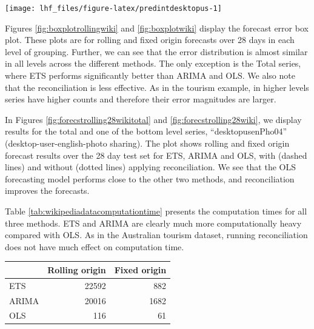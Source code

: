 \documentclass[11pt,a4paper,]{article}
\let\origfigure\figure
\let\endorigfigure\endfigure
\renewenvironment{figure}[1][2] {
    \expandafter\origfigure\expandafter[!htbp]
} {
    \endorigfigure
}
\let\origtable\table
\let\endorigtable\endtable
\renewenvironment{table}[1][2] {
    \expandafter\origtable\expandafter[!htbp]
} {
    \endorigtable
}
\begin{document}
\begin{figure}

{\centering \texttt{[image: lhf\_files/figure-latex/predintdesktopus-1]} 

}

\caption{The actual test set for the 'desktopusenPho04' bottom level series compared to the forecasts from reconciled and unreconciled OLS methods with prediction interval for rolling and fixed origin  Wikipedia pageviews.}\label{fig:predintdesktopus}
\end{figure}

Figures \ref{fig:boxplotrollingwiki} and \ref{fig:boxplotwiki} display the forecast error box plot. These plots are for rolling and fixed origin forecasts over 28 days in each level of grouping. Further, we can see that the error distribution is almost similar in all levels across the different methods. The only exception is the Total series, where ETS performs significantly better than ARIMA and OLS. We also note that the reconciliation is less effective. As in the tourism example, in higher levels series have higher counts and therefore their error magnitudes are larger.

In Figures \ref{fig:forecstrolling28wikitotal} and \ref{fig:forecstrolling28wiki}, we display results for the total and one of the bottom level series, ``desktopusenPho04'' (desktop-user-english-photo sharing). The plot shows rolling and fixed origin forecast results over the 28 day test set for ETS, ARIMA and OLS, with (dashed lines) and without (dotted lines) applying reconciliation. We see that the OLS forecasting model performs close to the other two methods, and reconciliation improves the forecasts.

Table \ref{tab:wikipediadatacomputationtime} presents the computation times for all three methods. ETS and ARIMA are clearly much more computationally heavy compared with OLS. As in the Australian tourism dataset, running reconciliation does not have much effect on computation time.

\begin{table}

\caption{\label{tab:wikipediadatacomputationtime}Computation time (seconds) for ETS, ARIMA and OLS with reconciliation - Rolling and fixed origin forecasts - Wikipedia dataset}
\centering
\begin{tabular}[t]{lrr}
\toprule
 & Rolling origin & Fixed origin\\
\midrule
ETS & 22592 & 882\\
ARIMA & 20016 & 1682\\
OLS & 116 & 61\\
\bottomrule
\end{tabular}
\end{table}

\clearpage

\printbibliography
\end{document}
